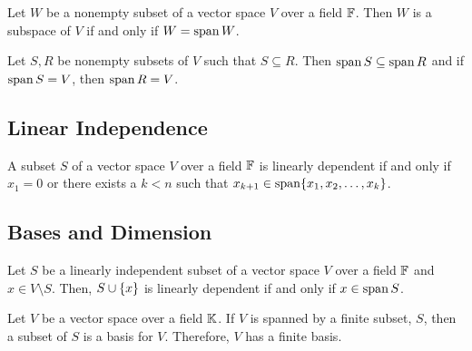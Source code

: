 \begin{proposition}
	Let $W$ be a nonempty subset of a vector space $V$ over a field $\mathbb{F}$.
	Then $W$ is a subspace of $V$ if and only if $W=\operatorname{span} W$.
\end{proposition}

\begin{proposition}
	Let $S,R$ be nonempty subsets of $V$ such that $S\subseteq R$.
	Then $\operatorname{span} S\subseteq \operatorname{span} R$ and if $\operatorname{span} S=V$, then $\operatorname{span} R=V$.
\end{proposition}

\pagebreak

\subsection{Linear Independence}

\begin{thm}
	A subset $S$ of a vector space $V$ over a field $\mathbb{F}$ is linearly dependent if and only if $x_1=0$ or there exists a $k<n$ such that $x_{k+1}\in\operatorname{span} \lbrace x_1,x_2,\ldots,x_k \rbrace$.
\end{thm}

\pagebreak

\subsection{Bases and Dimension}

\begin{thm}
	Let $S$ be a linearly independent subset of a vector space $V$ over a field $\mathbb{F}$ and $x\in V\setminus S$.
	Then, $S\cup\lbrace x \rbrace$ is linearly dependent if and only if $x\in\operatorname{span} S$.
\end{thm}

\begin{thm}
	Let $V$ be a vector space over a field $\mathbb{K}$.
	If $V$ is spanned by a finite subset, $S$, then a subset of $S$ is a basis for $V$.
	Therefore, $V$ has a finite basis.
\end{thm}
